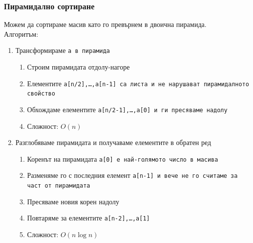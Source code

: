 \documentclass[alsotrans,beameroptions={aspectratio=169}]{beamerswitch}
\begin{document}
\begin{frame}
  \frametitle{Пирамидално сортиране}

  Можем да сортираме масив като го превърнем в двоична пирамида.\\
  \pause
  Алгоритъм:
  \renewcommand{\theenumii}{\alph{enumii}}
  \begin{enumerate}[<+->]
  \item Трансформираме \tt a в пирамида
    \begin{enumerate}[<+(1)->]
    \item Строим пирамидата отдолу-нагоре
    \item Елементите \tt{a[n/2]},\ldots,\tt{a[n-1]} са листа и не нарушават пирамидалното свойство
    \item Обхождаме елементите \tt{a[n/2-1]},\ldots,\tt{a[0]} и ги пресяваме надолу
    \item Сложност: $O(n)$
    \end{enumerate}
  \item<3-> Разглобяваме пирамидата и получаваме елементите в обратен ред%
    \begin{enumerate}[<+(1)->]
    \item Коренът на пирамидата \tt{a[0]} е най-голямото число в масива
    \item Разменяме го с последния елемент \tt{a[n-1]} и вече не го считаме за част от пирамидата
    \item Пресяваме новия корен надолу
    \item Повтаряме за елементите \tt{a[n-2]},\ldots,\tt{a[1]}
    \item Сложност: $O(n\log n)$
    \end{enumerate}
  \end{enumerate}
\end{frame}
\end{document}
